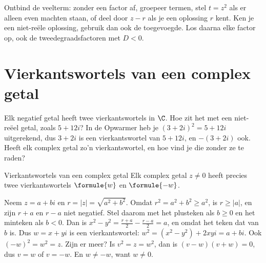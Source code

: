 \begin{werkwijze}
Ontbind de veelterm: zonder een factor af, groepeer termen, stel $t = z^2$ als er alleen even machten staan, of deel door $z - r$ als je een oplossing $r$ kent. Ken je een niet-reële oplossing, gebruik dan ook de toegevoegde. Los daarna elke factor op, ook de tweedegraadsfactoren met $D < 0$.
\end{werkwijze}

\begin{oefeningen}


\end{oefeningen}

\section{Vierkantswortels van een complex getal}

Elk negatief getal heeft twee vierkantswortels in $\C$. Hoe zit het met een niet-reëel getal, zoals $5 + 12i$? In de Opwarmer heb je $(3 + 2i)^2 = 5 + 12i$ uitgerekend, dus $3 + 2i$ is een vierkantswortel van $5 + 12i$, en $-(3 + 2i)$ ook. Heeft elk complex getal zo'n vierkantswortel, en hoe vind je die zonder ze te raden?

\begin{theorie}
\begin{stelling}{Vierkantswortels van een complex getal}
Elk complex getal $z \neq 0$ heeft precies twee vierkantswortels $\formule{w}$ en $\formule{-w}$.
\end{stelling}

\begin{bewijs}
Neem $z = a + bi$ en $r = |z| = \sqrt{a^2 + b^2}$. Omdat $r^2 = a^2 + b^2 \geqslant a^2$, is $r \geqslant |a|$, en zijn $r + a$ en $r - a$ niet negatief. Stel daarom
met het plusteken als $b \geqslant 0$ en het minteken als $b < 0$. Dan is $x^2 - y^2 = \frac{r + a}{2} - \frac{r - a}{2} = a$, en
omdat het teken dat van $b$ is. Dus $w = x + yi$ is een vierkantswortel: $w^2 = (x^2 - y^2) + 2xyi = a + bi$. Ook $(-w)^2 = w^2 = z$. Zijn er meer? Is $v^2 = z = w^2$, dan is $(v - w)(v + w) = 0$, dus $v = w$ of $v = -w$. En $w \neq -w$, want $w \neq 0$.
\end{bewijs}
\end{theorie}

